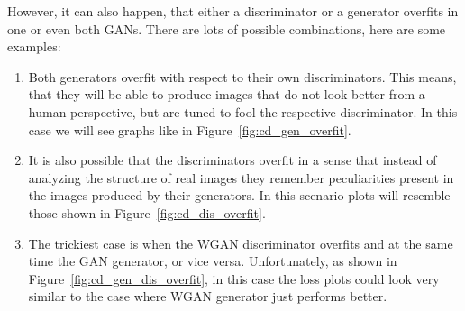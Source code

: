 	
However, it can also happen, that either a discriminator or a generator overfits in one or even both GANs. There are lots of possible combinations, here are some examples:
\begin{enumerate}
	\item Both generators overfit with respect to their own discriminators. This means, that they will be able to produce images that do not look better from a human perspective, but are tuned to fool the respective discriminator. In this case we will see graphs like in Figure~\ref{fig:cd_gen_overfit}.
	\item It is also possible that the discriminators overfit in a sense that instead of analyzing the structure of real images they remember peculiarities present in the images produced by their generators. In this scenario plots will resemble those shown in Figure~\ref{fig:cd_dis_overfit}.
	\item The trickiest case is when the WGAN discriminator overfits and at the same time the GAN generator, or vice versa. Unfortunately, as shown in Figure~\ref{fig:cd_gen_dis_overfit}, in this case the loss plots could look very similar to the case where WGAN generator just performs better.
\end{enumerate}

